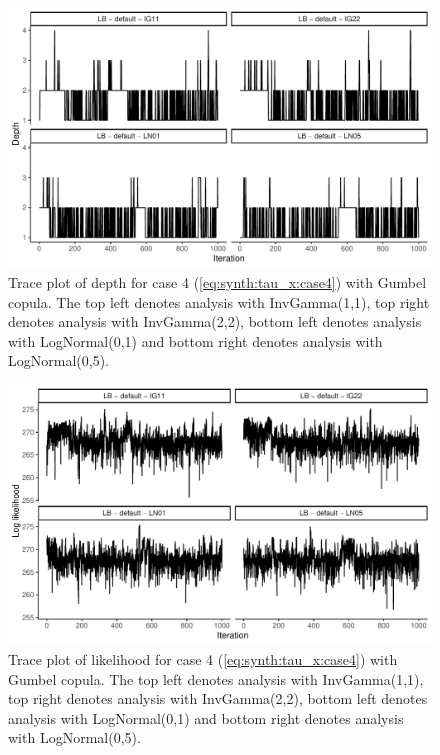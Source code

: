 \documentclass{amsart}
\begin{document}
\begin{figure}
	\centering
	\includegraphics[width = 0.75\linewidth]{trace_case4_gumbel_depth.pdf}
	\caption{Trace plot of depth for case 4 (\cref{eq:synth:tau_x:case4}) with Gumbel copula. The top left denotes analysis with InvGamma(1,1), top right denotes analysis with InvGamma(2,2), bottom left denotes analysis with LogNormal(0,1) and bottom right denotes analysis with LogNormal(0,5).}
	\label{fig:case4:gumbel:depth}
\end{figure}

\begin{figure}
	\centering
	\includegraphics[width = 0.75\linewidth]{trace_case4_gumbel_like.pdf}
	\caption{Trace plot of likelihood for case 4 (\cref{eq:synth:tau_x:case4}) with Gumbel copula. The top left denotes analysis with InvGamma(1,1), top right denotes analysis with InvGamma(2,2), bottom left denotes analysis with LogNormal(0,1) and bottom right denotes analysis with LogNormal(0,5).}
	\label{fig:case4:gumbel:like}
\end{figure}





\end{document}
